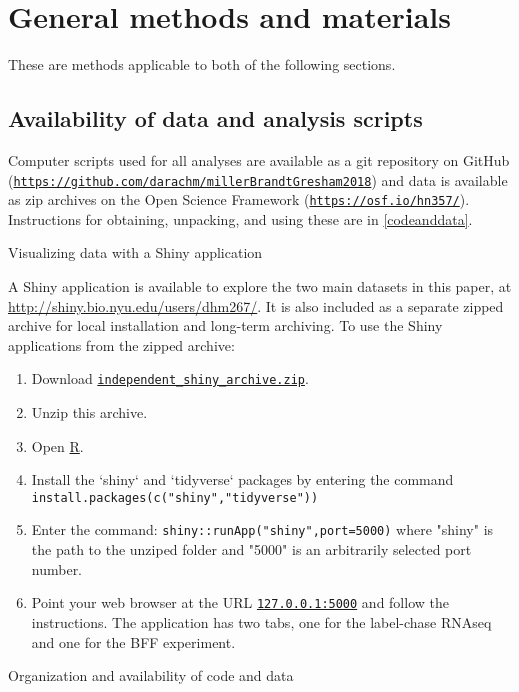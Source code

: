 \section{General methods and materials}

These are methods applicable to both of the following sections.

\subsection{Availability of data and analysis scripts}

Computer scripts used for all analyses are available as a git repository
on GitHub
(\texttt{\url{https://github.com/darachm/millerBrandtGresham2018}})
and data is available as zip archives on the Open Science
Framework (\texttt{\url{https://osf.io/hn357/}}).
Instructions for obtaining, unpacking, and using these are in
\autoref{codeanddata}.

  \label{shiny}
  Visualizing data with a Shiny application
  
  A Shiny application is available to explore the two main 
  datasets in this paper, at
  \url{http://shiny.bio.nyu.edu/users/dhm267/}. It
  is also included as a separate zipped archive for local
  installation and long-term archiving. 
  To use the Shiny applications from the zipped archive: 
  
  \begin{enumerate}
  \item Download
  \href{https://osf.io/ecyj9/}{\texttt{independent\_shiny\_archive.zip}}.
  \item Unzip this archive.
  \item Open \href{http://cran.r-project.org/}{R}.
  \item Install the `shiny` and `tidyverse` packages by entering the command
    \texttt{install.packages(c("shiny","tidyverse"))}
  \item Enter the command: 
    \texttt{shiny::runApp("shiny",port=5000)}
    where "shiny" is the path to the unziped folder and "5000" is 
    an arbitrarily selected port number.
  \item Point your web browser at the URL \texttt{\url{127.0.0.1:5000}}
      and follow the instructions. The application has two tabs,
      one for the label-chase RNAseq and one for the BFF experiment.
  \end{enumerate}

  \label{codeanddata}
  Organization and availability of code and data
  
